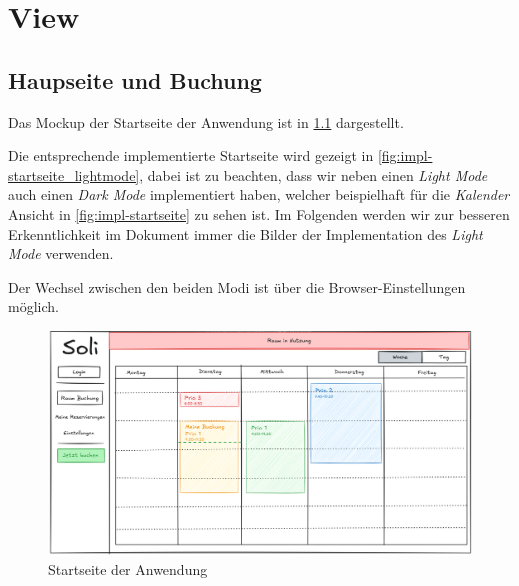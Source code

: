 
\chapter{View}
\label{chap:view}


\section{Haupseite und Buchung}

Das Mockup der Startseite der Anwendung ist in \ref{fig:startseite} dargestellt.

Die entsprechende implementierte Startseite wird gezeigt in \ref{fig:impl-startseite_lightmode},
dabei ist zu beachten, dass wir neben einen \textit{Light Mode} auch einen \textit{Dark Mode} implementiert haben,
welcher beispielhaft für die \textit{Kalender} Ansicht in \ref{fig:impl-startseite} zu sehen ist.
Im Folgenden werden wir zur besseren Erkenntlichkeit im Dokument immer die Bilder der Implementation des \textit{Light Mode}
verwenden.

Der Wechsel zwischen den beiden Modi ist über die Browser-Einstellungen möglich.

\begin{figure}[ht]
    \centering
    \includegraphics[width=\textwidth]{figures/mockup/calendar}
    \caption{Startseite der Anwendung}
    \label{fig:startseite}
\end{figure}
\pagebreak

